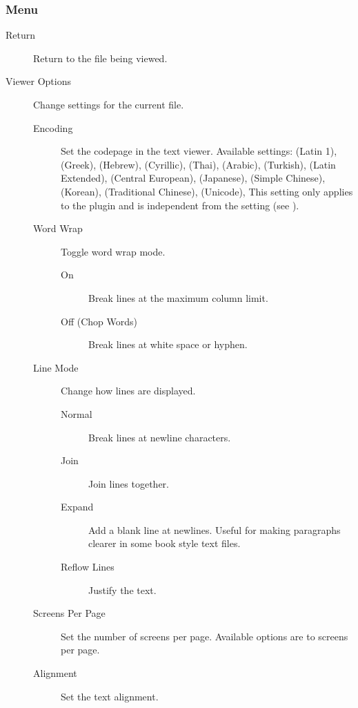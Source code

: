 \subsubsection{Menu}

\begin{description}
\item[Return] Return to the file being viewed.
\item[Viewer Options] Change settings for the current file.
    \begin{description}
    \item[Encoding] Set the codepage in the text viewer.
    Available settings:
     (Latin 1),
     (Greek),
     (Hebrew),
     (Cyrillic),
     (Thai),
     (Arabic),
     (Turkish),
     (Latin Extended),
     (Central European),
     (Japanese),
     (Simple Chinese),
     (Korean),
     (Traditional Chinese),
     (Unicode),
    This setting only applies to the plugin and is independent from the
     setting (see ).
    \item[Word Wrap] Toggle word wrap mode.
        \begin{description}
            \item[On] Break lines at the maximum column limit.
            \item[Off (Chop Words)] Break lines at white space or hyphen.
        \end{description}
    \item[Line Mode] Change how lines are displayed.
        \begin{description}
            \item[Normal] Break lines at newline characters.
            \item[Join] Join lines together.
            \item[Expand] Add a blank line at newlines. Useful for making paragraphs
            clearer in some book style text files.
            \item[Reflow Lines] Justify the text.
        \end{description}
    \item[Screens Per Page] Set the number of screens per page. Available
      options are  to  screens per page.
    \item[Alignment] Set the text alignment.

\end{description}
\end{description}
